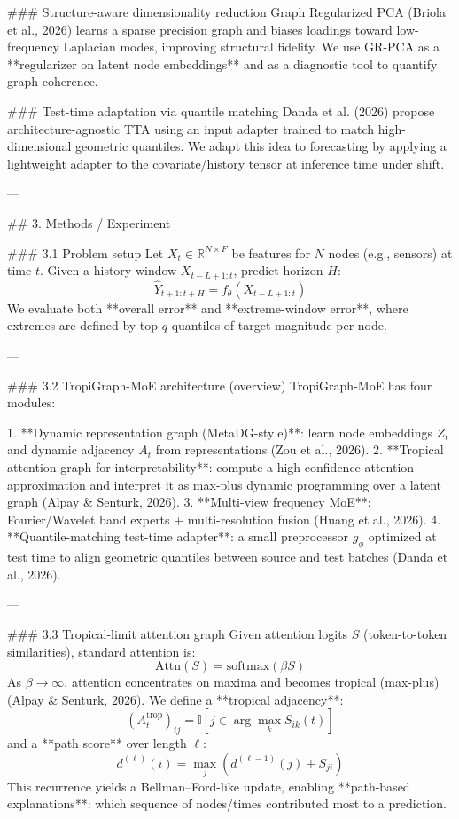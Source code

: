 ### Structure-aware dimensionality reduction  
Graph Regularized PCA (Briola et al., 2026) learns a sparse precision graph and biases loadings toward low-frequency Laplacian modes, improving structural fidelity. We use GR-PCA as a **regularizer on latent node embeddings** and as a diagnostic tool to quantify graph-coherence.

### Test-time adaptation via quantile matching  
Danda et al. (2026) propose architecture-agnostic TTA using an input adapter trained to match high-dimensional geometric quantiles. We adapt this idea to forecasting by applying a lightweight adapter to the covariate/history tensor at inference time under shift.

---

## 3. Methods / Experiment  

### 3.1 Problem setup  
Let \(X_{t} \in \mathbb{R}^{N \times F}\) be features for \(N\) nodes (e.g., sensors) at time \(t\). Given a history window \(X_{t-L+1:t}\), predict horizon \(H\):  
\[
\hat{Y}_{t+1:t+H} = f_\theta(X_{t-L+1:t})
\]
We evaluate both **overall error** and **extreme-window error**, where extremes are defined by top-\(q\) quantiles of target magnitude per node.

---

### 3.2 TropiGraph-MoE architecture (overview)  
TropiGraph-MoE has four modules:

1. **Dynamic representation graph (MetaDG-style)**: learn node embeddings \(Z_t\) and dynamic adjacency \(A_t\) from representations (Zou et al., 2026).  
2. **Tropical attention graph for interpretability**: compute a high-confidence attention approximation and interpret it as max-plus dynamic programming over a latent graph (Alpay & Senturk, 2026).  
3. **Multi-view frequency MoE**: Fourier/Wavelet band experts + multi-resolution fusion (Huang et al., 2026).  
4. **Quantile-matching test-time adapter**: a small preprocessor \(g_\phi\) optimized at test time to align geometric quantiles between source and test batches (Danda et al., 2026).

---

### 3.3 Tropical-limit attention graph  
Given attention logits \(S\) (token-to-token similarities), standard attention is:
\[
\text{Attn}(S) = \text{softmax}(\beta S)
\]
As \(\beta \to \infty\), attention concentrates on maxima and becomes tropical (max-plus) (Alpay & Senturk, 2026). We define a **tropical adjacency**:
\[
(A^{\text{trop}}_t)_{ij} = \mathbb{I}\left[j \in \arg\max_k S_{ik}(t)\right]
\]
and a **path score** over length \(\ell\):
\[
d^{(\ell)}(i) = \max_j \left(d^{(\ell-1)}(j) + S_{ji}\right)
\]
This recurrence yields a Bellman–Ford-like update, enabling **path-based explanations**: which sequence of nodes/times contributed most to a prediction.

